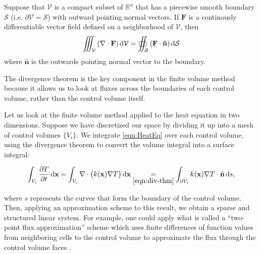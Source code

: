 \begin{thm}
	Suppose that $\mathcal{V}$ is a compact subset of $\mathbb{R}^n$ that has a piecewise smooth boundary $\mathcal{S}$ (i.e. $\partial\mathcal{V}=\mathcal{S}$) with outward pointing normal vectors. If $\mathbf{F}$ is a continously differentiable vector field defined on a neighborhood of $\mathcal{V}$, then
	\begin{equation}
		\iiint_{\mathcal{V}}\left(\nabla\cdot\mathbf{F}\right)\dif\mathcal{V}=\oiint_{\mathcal{S}}\left(\mathbf{F}\cdot\mathbf{\hat{n}}\right)\dif\mathcal{S}\label{eqn:div-thm}
	\end{equation}
	where $\hat{\mathbf{n}}$ is the outwards pointing normal vector to the boundary.
	\label{thm:div-thm}
\end{thm}

The divergence theorem is the key component in the finite volume method because it allows us to look at fluxes across the boundaries of each control volume, rather than the control volume itself.

Let us look at the finite volume method applied to the heat equation in two dimensions. Suppose we have discretized our space by dividing it up into a mesh of control volumes $\lbrace V_i\rbrace$. We integrate \eqref{eqn:HeatEq} over each control volume, using the divergence theorem to convert the volume integral into a surface integral:

\begin{equation}
	\int_{V_i}\frac{\partial T}{\partial t}\dif\mathbf{x}=\int_{V_i}\nabla\cdot \left(k(\mathbf{x})\nabla T\right)\dif\mathbf{x}\underset{\eqref{eqn:div-thm}}{=}\int_{\partial V_i}k(\mathbf{x})\nabla T\cdot\hat{\mathbf{n}}\dif s,\label{eqn:Vol-to-Surface-FVM}
\end{equation}

\noindent where $s$ represents the curves that form the boundary of the control volume. Then, applying an approximation scheme to this result, we obtain a sparse and structured linear system. For example, one could apply what is called a ``two-point flux approximation'' scheme which uses finite differences of function values from neighboring cells to the control volume to approximate the flux through the control volume faces \cite{Versteeg2007}.

